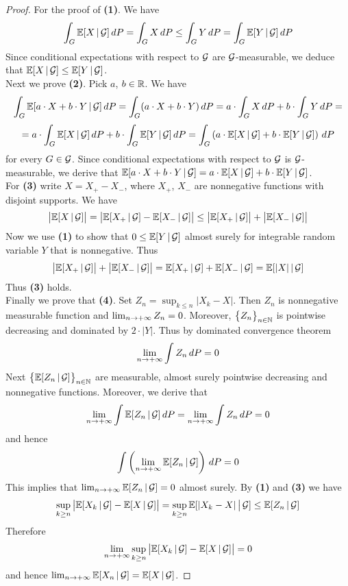 \begin{proof}
For the proof of \textbf{(1)}. We have 
$$\int_G\mathbb{E}[X\,|\,{\mathcal G}]\,dP = \int_GX\,dP \leq \int_GY\,dP = \int_G\mathbb{E}[Y\,|\,{\mathcal G}]\,dP$$
Since conditional expectations with respect to ${\mathcal G}$ are ${\mathcal G}$-measurable, we deduce that $\mathbb{E}[X\,|\,{\mathcal G}] \leq \mathbb{E}[Y\,|\,{\mathcal G}]$.\\
Next we prove \textbf{(2)}. Pick $a$, $b\in {\mathbb R}$. We have
$$\int_G\mathbb{E}[a\cdot X+b\cdot Y\,|\,{\mathcal G}]\,dP = \int_G(a\cdot X+b\cdot Y)\,dP = a\cdot \int_GX\,dP+b\cdot \int_GY\,dP =$$
$$= a\cdot \int_G\mathbb{E}[X\,|\,{\mathcal G}]\,dP+b\cdot \int_G\mathbb{E}[Y\,|\,{\mathcal G}]\,dP =\int_G\left(a\cdot \mathbb{E}[X\,|\,{\mathcal G}]+b\cdot \mathbb{E}[Y\,|\,{\mathcal G}]\right)\,dP$$
for every $G\in {\mathcal G}$. Since conditional expectations with respect to ${\mathcal G}$ is ${\mathcal G}$-measurable, we derive that $\mathbb{E}[a\cdot X+b\cdot Y\,|\,{\mathcal G}] = a\cdot \mathbb{E}[X\,|\,{\mathcal G}]+b\cdot \mathbb{E}[Y\,|\,{\mathcal G}]$.\\
For \textbf{(3)} write $X = X_+-X_-$, where $X_+$, $X_-$ are nonnegative functions with disjoint supports. We have
$$\big|\mathbb{E}[X\,|\,{\mathcal G}]\big| = \big|\mathbb{E}[X_+\,|\,{\mathcal G}]-\mathbb{E}[X_-\,|\,{\mathcal G}]\big| \leq \big|\mathbb{E}[X_+\,|\,{\mathcal G}]\big|+\big|\mathbb{E}[X_-\,|\,{\mathcal G}]\big|$$
Now we use \textbf{(1)} to show that $0\leq \mathbb{E}[Y\,|\,{\mathcal G}]$ almost surely for integrable random variable $Y$ that is nonnegative. Thus
$$\big|\mathbb{E}[X_+\,|\,{\mathcal G}]\big|+\big|\mathbb{E}[X_-\,|\,{\mathcal G}]\big| = \mathbb{E}[X_+\,|\,{\mathcal G}]+\mathbb{E}[X_-\,|\,{\mathcal G}] = \mathbb{E}[|X|\,|\,{\mathcal G}]$$ 
Thus \textbf{(3)} holds.\\
Finally we prove that \textbf{(4)}. Set $Z_n = \sup_{k\leq n}|X_k-X|$. Then $Z_n$ is nonnegative measurable function and $\lim_{n\rightarrow +\infty}Z_n = 0$. Moreover, $\big\{Z_n\big\}_{n\in {\mathbb N}}$ is pointwise decreasing and dominated by $2\cdot |Y|$. Thus by dominated convergence theorem
$$\lim_{n\rightarrow +\infty}\int Z_n \,dP= 0$$
Next $\big\{\mathbb{E}[Z_n\,|\,{\mathcal G}]\big\}_{n\in {\mathbb N}}$ are measurable, almost surely pointwise decreasing and nonnegative functions. Moreover, we derive that
$$\lim_{n\rightarrow +\infty}\int \mathbb{E}[Z_n\,|\,{\mathcal G}]\,dP =\lim_{n\rightarrow +\infty}\int Z_n\,dP = 0$$
and hence 
$$\int \left(\lim_{n\rightarrow +\infty}\mathbb{E}[Z_n\,|\,{\mathcal G}]\right)\,dP = 0$$
This implies that $\lim_{n\rightarrow +\infty}\mathbb{E}[Z_n\,|\,{\mathcal G}]=0$ almost surely. By \textbf{(1)} and \textbf{(3)} we have
$$\sup_{k\geq n}\big|\mathbb{E}[X_k\,|\,{\mathcal G}]-\mathbb{E}[X\,|\,{\mathcal G}]\big|= \sup_{k\geq n}\mathbb{E}[|X_k-X|\,\big|\,{\mathcal G}] \leq \mathbb{E}[Z_n\,|\,{\mathcal G}] $$
Therefore
$$\lim_{n\rightarrow +\infty}\sup_{k\geq n}\big|\mathbb{E}[X_k\,|\,{\mathcal G}]-\mathbb{E}[X\,|\,{\mathcal G}]\big| = 0$$
and hence $\lim_{n\rightarrow +\infty}\mathbb{E}[X_n\,|\,{\mathcal G}] = \mathbb{E}[X\,|\,{\mathcal G}]$.
\end{proof}

